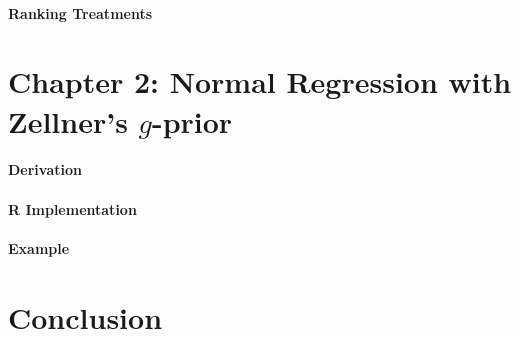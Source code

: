 \documentclass[12pt, a4paper]{article}
\begin{document}
      \paragraph{Ranking Treatments}

\clearpage


\section{Chapter 2:  Normal Regression with Zellner's $g$-prior}
  \paragraph{Derivation}
  \paragraph{R Implementation}
  \paragraph{Example}


\clearpage

\section{Conclusion}
\end{document}
